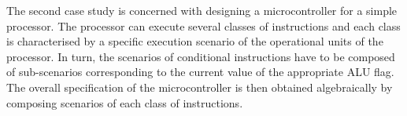 The second case study is concerned with designing a microcontroller
for a simple processor. The processor can execute several classes
of instructions and each class is characterised by a specific execution
scenario of the operational units of the processor. In turn, the scenarios
of conditional instructions have to be composed of sub-scenarios corresponding
to the current value of the appropriate ALU flag. The overall specification
of the microcontroller is then obtained algebraically by composing
scenarios of each class of instructions.



